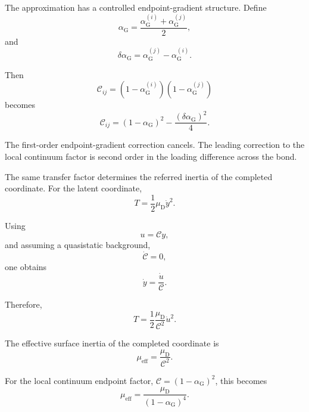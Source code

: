 The approximation has a controlled endpoint-gradient structure. Define
\begin{equation}
    \alpha_{\mathrm{G}} = \frac{ \alpha_{\mathrm{G}}^{(i)} + \alpha_{\mathrm{G}}^{(j)} }{2},
\end{equation}
and
\begin{equation}
    \delta\alpha_{\mathrm{G}} = \alpha_{\mathrm{G}}^{(j)} - \alpha_{\mathrm{G}}^{(i)}.
\end{equation}

Then
\begin{equation}
    \mathcal{C}_{ij} = \left( 1-\alpha_{\mathrm{G}}^{(i)} \right) \left( 1-\alpha_{\mathrm{G}}^{(j)} \right)
\end{equation}
becomes
\begin{equation}
    \mathcal{C}_{ij} = (1-\alpha_{\mathrm{G}})^2 - \frac{ (\delta\alpha_{\mathrm{G}})^2 }{4}.
\end{equation}

The first-order endpoint-gradient correction cancels. The leading correction to the local continuum factor is second order in the loading difference across the bond.

The same transfer factor determines the referred inertia of the completed coordinate. For the latent coordinate,
\begin{equation}
    T = \frac{1}{2} \mu_{\mathrm{D}}\dot{y}^2.
\end{equation}

Using
\begin{equation}
    u = \mathcal{C} y,
\end{equation}
and assuming a quasistatic background,
\begin{equation}
    \dot{\mathcal{C}} = 0,
\end{equation}
one obtains
\begin{equation}
    \dot{y} = \frac{\dot{u}}{\mathcal{C}}.
\end{equation}

Therefore,
\begin{equation}
    T = \frac{1}{2} \frac{\mu_{\mathrm{D}}}{\mathcal{C}^2} \dot{u}^2.
\end{equation}

The effective surface inertia of the completed coordinate is
\begin{equation}
    \mu_{\mathrm{eff}} = \frac{\mu_{\mathrm{D}}}{\mathcal{C}^2}.
\end{equation}

For the local continuum endpoint factor, $\mathcal{C}=(1-\alpha_{\mathrm{G}})^2$, this becomes
\begin{equation}
    \boxed{ \mu_{\mathrm{eff}} = \frac{\mu_{\mathrm{D}}}{(1-\alpha_{\mathrm{G}})^4} }.
\end{equation}

